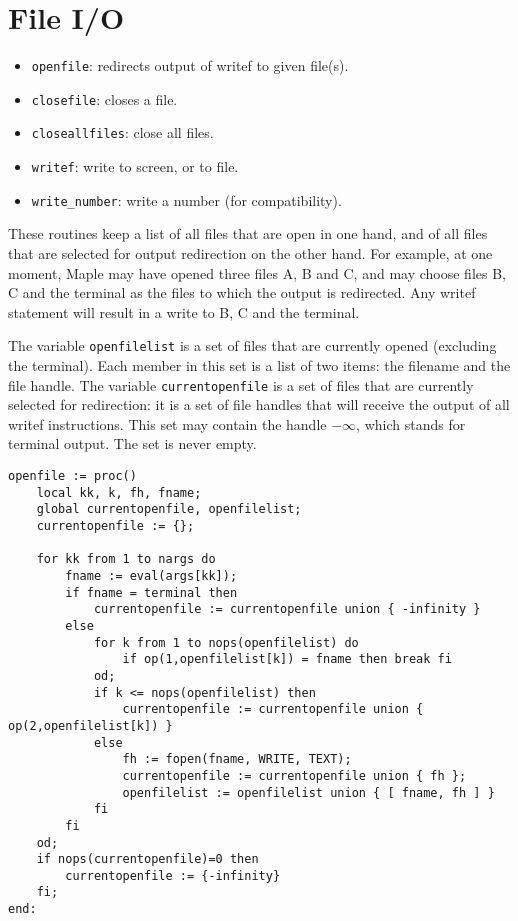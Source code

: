 \documentclass[a4paper,10pt]{article}
\begin{document}
\section{File I/O}

\begin{itemize}
\item   \verb+openfile+: redirects output of writef to given file(s).
\item   \verb+closefile+: closes a file.
\item   \verb+closeallfiles+: close all files.
\item   \verb+writef+: write to screen, or to file.
\item   \verb+write_number+: write a number (for compatibility).
\end{itemize}

These routines keep a list of all files that are open in one hand, and of all files
that are selected for output redirection on the other hand.  For example, at one
moment, Maple may have opened three files A, B and C, and may choose files B, C and the terminal
as the files to which the output is redirected.  Any writef statement will result in a write
to B, C and the terminal.

The variable \verb+openfilelist+ is a set of files that are currently opened (excluding the terminal).
Each member in this set is a list of two items: the filename and the file handle.  The variable
\verb+currentopenfile+ is a set of files that are currently selected for redirection: it is a set
of file handles that will receive the output of all writef instructions.  This set may contain the
handle $-\infty$, which stands for terminal output.  The set is never empty.

\begin{lstlisting}[name=tools]
openfile := proc()
    local kk, k, fh, fname;
    global currentopenfile, openfilelist;
    currentopenfile := {};

    for kk from 1 to nargs do
        fname := eval(args[kk]);
        if fname = terminal then
            currentopenfile := currentopenfile union { -infinity }
        else
            for k from 1 to nops(openfilelist) do
                if op(1,openfilelist[k]) = fname then break fi
            od;
            if k <= nops(openfilelist) then
                currentopenfile := currentopenfile union { op(2,openfilelist[k]) }
            else
                fh := fopen(fname, WRITE, TEXT);
                currentopenfile := currentopenfile union { fh };
                openfilelist := openfilelist union { [ fname, fh ] }
            fi
        fi
    od;
    if nops(currentopenfile)=0 then
        currentopenfile := {-infinity}
    fi;
end:
\end{lstlisting}
\end{document}
